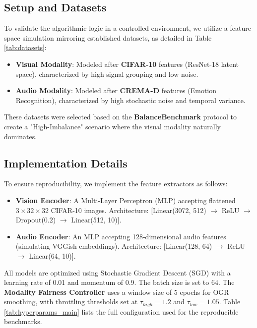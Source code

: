 \documentclass[10pt, twocolumn, letterpaper]{article}
\begin{document}
\subsection{Setup and Datasets}
To validate the algorithmic logic in a controlled environment, we utilize a feature-space simulation mirroring established datasets, as detailed in Table \ref{tab:datasets}:
\begin{itemize}
    \item \textbf{Visual Modality}: Modeled after \textbf{CIFAR-10} \cite{cifar10} features (ResNet-18 latent space), characterized by high signal grouping and low noise.
    \item \textbf{Audio Modality}: Modeled after \textbf{CREMA-D} \cite{cremad} features (Emotion Recognition), characterized by high stochastic noise and temporal variance.
\end{itemize}
These datasets were selected based on the \textbf{BalanceBenchmark} \cite{balancebenchmark} protocol to create a "High-Imbalance" scenario where the visual modality naturally dominates.

\begin{table}[h]
\centering
{}
\caption{\textbf{Benchmark Dataset Specifications.} We align our feature simulation with the statistical moments of these standard datasets to ensure realistic imbalance dynamics.}
\label{tab:datasets}
\end{table}

\subsection{Implementation Details}
To ensure reproducibility, we implement the feature extractors as follows:
\begin{itemize}
    \item \textbf{Vision Encoder}: A Multi-Layer Perceptron (MLP) accepting flattened $3 \times 32 \times 32$ CIFAR-10 images. Architecture: [Linear(3072, 512) $\rightarrow$ ReLU $\rightarrow$ Dropout(0.2) $\rightarrow$ Linear(512, 10)].
    \item \textbf{Audio Encoder}: An MLP accepting 128-dimensional audio features (simulating VGGish embeddings). Architecture: [Linear(128, 64) $\rightarrow$ ReLU $\rightarrow$ Linear(64, 10)].
\end{itemize}
All models are optimized using Stochastic Gradient Descent (SGD) with a learning rate of 0.01 and momentum of 0.9. The batch size is set to 64. The \textbf{Modality Fairness Controller} uses a window size of 5 epochs for OGR smoothing, with throttling thresholds set at $\tau_{high}=1.2$ and $\tau_{low}=1.05$. Table \ref{tab:hyperparams_main} lists the full configuration used for the reproducible benchmarks.
\end{document}
